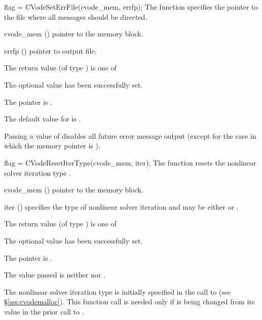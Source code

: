 {
flag = CVodeSetErrFile(cvode\_mem, errfp);
}
{
  The function  specifies the pointer to the file
  where all {\cvode} messages should be directed.
}
{
  \begin{args}
  \item[cvode\_mem] ()
    pointer to the {\cvode} memory block.
  \item[errfp] ()
    pointer to output file.
  \end{args}
}
{
  The return value  (of type ) is one of
  \begin{args}
  \item[\Id{CV\_SUCCESS}] 
    The optional value has been successfully set.
  \item[\Id{CV\_MEM\_NULL}]
    The  pointer is .
  \end{args}
}
{
  The default value for  is . 

  Passing a value of  disables all future error message output
  (except for the case in which the {\cvode} memory pointer is ).
}
{
flag = CVodeResetIterType(cvode\_mem, iter);
}
{
  The function  resets the nonlinear solver
  iteration type .
}
{
  \begin{args}
  \item[cvode\_mem] ()
    pointer to the {\cvode} memory block.
  \item[iter] ()
    specifies the type of nonlinear solver iteration and may be
    either  or . 
  \end{args}
}
{
  The return value  (of type ) is one of
  \begin{args}
  \item[\Id{CV\_SUCCESS}] 
    The optional value has been successfully set.
  \item[\Id{CV\_MEM\_NULL}]
    The  pointer is .
  \item[\Id{CV\_ILL\_INPUT}]
    The  value passed is neither  nor .
  \end{args}
}
{
  The nonlinear solver iteration type is initially specified in the call
  to  (see \S\ref{sss:cvodemalloc}). This function call is
  needed only if  is being changed from its value in the prior call 
  to .
}
